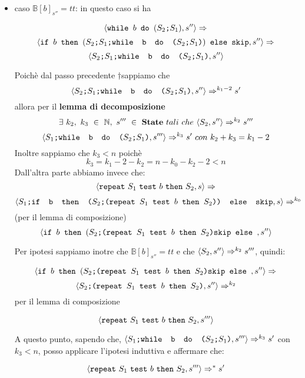 {\begin{itemize}
	\[ 	\confSs{
			\ifABC{b}{(\concat{$S_2$}{(\repeatSbS{$S_1$}{$b$}{$S_2$})})} 
			{\skipistr}}{s''}\Rar{} \]
	\[ 	\confSs{\skipistr}{s''}\Rar{}s'' \]

		Ottenedo lo stesso stato finale quindi dell'implicazione di partenza.

		\item caso $\mathbb{B}[b]_{s''}=tt$: in questo caso si ha 

		\[ \confSs{\wbS{b}{(\concat{$S_2$}{$S_1$})}}{s''}\Rar{} \]
		\[ \confSs{\ifABC{b}{(\concat{\concat{$S_2$}{$S_1$}}
		{\wbS{b}{(\concat{$S_2$}{$S_1$})}})}{\skipistr}}{s''}\Rar{} \]
	\[ 	\confSs{\concat{\concat{$S_2$}{$S_1$}}
		{\wbS{b}{(\concat{$S_2$}{$S_1$})}}}{s''} \]

		Poichè dal passo precedente $\dagger $sappiamo che 
		\[ \confSs{\concat{\concat{$S_2$}{$S_1$}}
			{\wbS{b}{(\concat{$S_2$}{$S_1$})}}}{s''}\Rar{k_1 -2}s' \]
		allora
		per il \textbf{lemma di decomposizione} \\ 
	\[ 	\exists{}~k_2,~k_3~\in~
		\mathbb{N},~s'''~\in~\states{}~tali~che~\confSs{S_2}{s''}\Rar{k_2}s'''\]
		\[\confSs{\concat{$S_1$}{\wbS{b}{(\concat{$S_2$}{$S_1$})}}}{s'''}
		\Rar{k_3}s'~con~k_2+k_3=k_1-2 \]
		Inoltre sappiamo che $k_3<n$ poichè 
	\[ 	k_3=k_1-2-k_2=n-k_0-k_2-2<n \]
		Dall'altra parte abbiamo invece che:
		\[ \confSs{\repeatSbS{S_1}{b}{S_2}}{s}\Rar{} \]
	\[ 	\confSs{\concat{$S_1$}{\ifABC{b}{(\concat{$S_2$}
		{(\repeatSbS{$S_1$}{$b$}{$S_2$})})}{\skipistr}}}{s}\Rar{k_0} \] (per il
		lemma di composizione)\\
	\[ 	\confSs{\ifABC{b}{(\concat{$S_2$}
		{(\repeatSbS{$S_1$}{$b$}{$S_2$})}{\skipistr}}}{s''} \]

		Per ipotesi sappiamo inotre che $\mathbb{B}[b]_{s''}=tt$ e che 
		$\confSs{S_2}{s''}\Rar{k_2}s'''$, quindi:
	
\[ 		\confSs{\ifABC{b}{(\concat{$S_2$}
		{(\repeatSbS{$S_1$}{$b$}{$S_2$})}{\skipistr}}}{s''}\Rar{} \]
	\[ 	\confSs{\concat{$S_2$}{(\repeatSbS{$S_1$}{$b$}{$S_2$})}}{s''}\Rar{k_2} \] per il lemma di composizione 

		\[ \confSs{\repeatSbS{S_1}{b}{S_2}}{s'''} \]

		A questo punto, sapendo che,
		$\confSs{\concat{$S_1$}{\wbS{b}{(\concat{$S_2$}{$S_1$})}}}{s'''}
		\Rar{k_3}s'$ con $k_3<n$, posso applicare l'ipotesi induttiva e affermare che:
	
		\[ \confSs{\repeatSbS{S_1}{b}{S_2}}{s'''}\Rar{*}s' \]
		
	\end{itemize}

}
